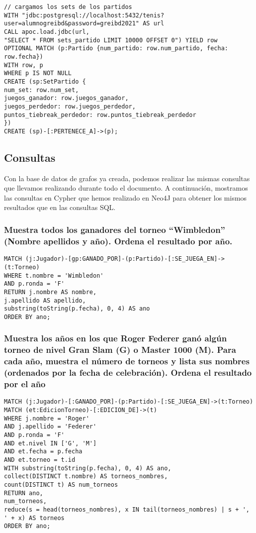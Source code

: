 \begin{lstlisting}[language=Cypher]
// cargamos los sets de los partidos
WITH "jdbc:postgresql://localhost:5432/tenis?user=alumnogreibd&password=greibd2021" AS url
CALL apoc.load.jdbc(url,
"SELECT * FROM sets_partido LIMIT 10000 OFFSET 0") YIELD row
OPTIONAL MATCH (p:Partido {num_partido: row.num_partido, fecha: row.fecha})
WITH row, p
WHERE p IS NOT NULL
CREATE (sp:SetPartido {
num_set: row.num_set,
juegos_ganador: row.juegos_ganador,
juegos_perdedor: row.juegos_perdedor,
puntos_tiebreak_perdedor: row.puntos_tiebreak_perdedor
})
CREATE (sp)-[:PERTENECE_A]->(p);
\end{lstlisting}


\subsection{Consultas}

Con la base de datos de grafos ya creada, podemos realizar las mismas consultas que llevamos realizando durante todo el documento. A continuación, mostramos las consultas en Cypher que hemos realizado en Neo4J para obtener los mismos resultados que en las consultas SQL. \\

\subsubsection{Muestra todos los ganadores del torneo ``Wimbledon'' (Nombre apellidos y año). Ordena el resultado por año.}

\begin{lstlisting}[language=Cypher]
MATCH (j:Jugador)-[gp:GANADO_POR]-(p:Partido)-[:SE_JUEGA_EN]->(t:Torneo)
WHERE t.nombre = 'Wimbledon'
AND p.ronda = 'F'
RETURN j.nombre AS nombre,
j.apellido AS apellido,
substring(toString(p.fecha), 0, 4) AS ano
ORDER BY ano;
\end{lstlisting}





\subsubsection{Muestra los años en los que Roger Federer ganó algún torneo de nivel Gran Slam (G) o Master 1000 (M). Para cada año, muestra el número de torneos y lista sus nombres (ordenados por la fecha de celebración). Ordena el resultado por el año}

\begin{lstlisting}[language=Cypher]
MATCH (j:Jugador)-[:GANADO_POR]-(p:Partido)-[:SE_JUEGA_EN]->(t:Torneo)
MATCH (et:EdicionTorneo)-[:EDICION_DE]->(t)
WHERE j.nombre = 'Roger'
AND j.apellido = 'Federer'
AND p.ronda = 'F'
AND et.nivel IN ['G', 'M']
AND et.fecha = p.fecha
AND et.torneo = t.id
WITH substring(toString(p.fecha), 0, 4) AS ano,
collect(DISTINCT t.nombre) AS torneos_nombres,
count(DISTINCT t) AS num_torneos
RETURN ano,
num_torneos,
reduce(s = head(torneos_nombres), x IN tail(torneos_nombres) | s + ', ' + x) AS torneos
ORDER BY ano;
\end{lstlisting}





